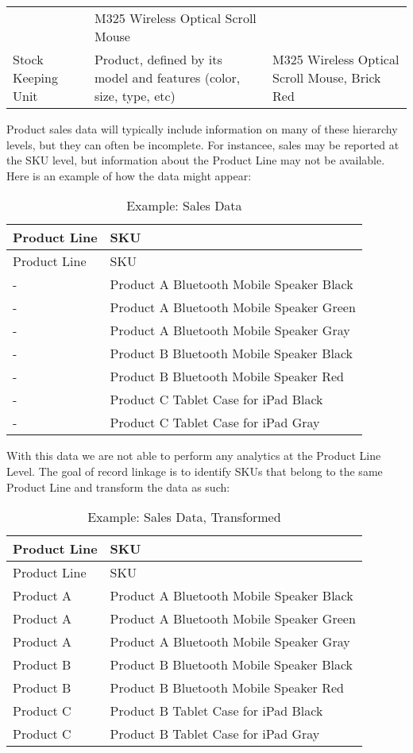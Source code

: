 \documentclass[]{article}
\begin{document}
\begin{longtable}[]{@{}lll@{}}
\begin{minipage}[t]{0.34\columnwidth}
\end{minipage} & \begin{minipage}[t]{0.38\columnwidth}\raggedright\strut
M325 Wireless Optical Scroll Mouse\strut
\end{minipage}\tabularnewline
\begin{minipage}[t]{0.18\columnwidth}\raggedright\strut
Stock Keeping Unit\strut
\end{minipage} & \begin{minipage}[t]{0.34\columnwidth}\raggedright\strut
Product, defined by its model and features (color, size, type,
etc)\strut
\end{minipage} & \begin{minipage}[t]{0.38\columnwidth}\raggedright\strut
M325 Wireless Optical Scroll Mouse, Brick Red\strut
\end{minipage}\tabularnewline
\bottomrule
\end{longtable}

Product sales data will typically include information on many of these
hierarchy levels, but they can often be incomplete. For instancee, sales
may be reported at the SKU level, but information about the Product Line
may not be available. Here is an example of how the data might appear:

\begin{longtable}[]{@{}ll@{}}
\caption{Example: Sales Data}\tabularnewline
\toprule
Product Line & SKU\tabularnewline
\midrule
\endfirsthead
\toprule
Product Line & SKU\tabularnewline
\midrule
\endhead
- & Product A Bluetooth Mobile Speaker Black\tabularnewline
- & Product A Bluetooth Mobile Speaker Green\tabularnewline
- & Product A Bluetooth Mobile Speaker Gray\tabularnewline
- & Product B Bluetooth Mobile Speaker Black\tabularnewline
- & Product B Bluetooth Mobile Speaker Red\tabularnewline
- & Product C Tablet Case for iPad Black\tabularnewline
- & Product C Tablet Case for iPad Gray\tabularnewline
\bottomrule
\end{longtable}

With this data we are not able to perform any analytics at the Product
Line Level. The goal of record linkage is to identify SKUs that belong
to the same Product Line and transform the data as such:

\begin{longtable}[]{@{}ll@{}}
\caption{Example: Sales Data, Transformed}\tabularnewline
\toprule
Product Line & SKU\tabularnewline
\midrule
\endfirsthead
\toprule
Product Line & SKU\tabularnewline
\midrule
\endhead
Product A & Product A Bluetooth Mobile Speaker Black\tabularnewline
Product A & Product A Bluetooth Mobile Speaker Green\tabularnewline
Product A & Product A Bluetooth Mobile Speaker Gray\tabularnewline
Product B & Product B Bluetooth Mobile Speaker Black\tabularnewline
Product B & Product B Bluetooth Mobile Speaker Red\tabularnewline
Product C & Product B Tablet Case for iPad Black\tabularnewline
Product C & Product B Tablet Case for iPad Gray\tabularnewline
\bottomrule
\end{longtable}
\end{document}
